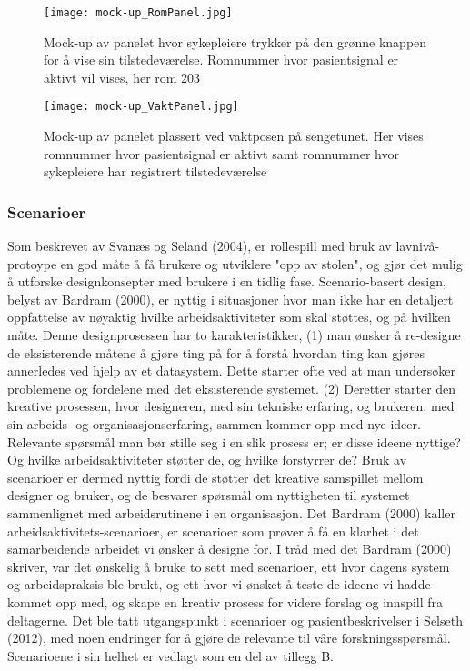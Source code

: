 \begin{figure}[H]
\centering
\texttt{[image: mock-up\_RomPanel.jpg]}
\caption{Mock-up av panelet hvor sykepleiere trykker på den grønne knappen for å vise sin tilstedeværelse. Romnummer hvor pasientsignal er aktivt vil vises, her rom 203}
\label{mock-up_RomPanel}
\end{figure}

\begin{figure}[H]
\centering
\texttt{[image: mock-up\_VaktPanel.jpg]}
\caption{Mock-up av panelet plassert ved vaktposen på sengetunet. Her vises romnummer hvor pasientsignal er aktivt samt romnummer hvor sykepleiere har registrert tilstedeværelse}
\label{mock-up_VaktPanel}
\end{figure}

\subsubsection{Scenarioer}
Som beskrevet av Svanæs og Seland (2004), er rollespill med bruk av lavnivå-protoype en god måte å få brukere og utviklere "opp av stolen", og gjør det mulig å utforske designkonsepter med brukere i en tidlig fase. Scenario-basert design, belyst av Bardram (2000), er nyttig i situasjoner hvor man ikke har en detaljert oppfattelse av nøyaktig hvilke arbeidsaktiviteter som skal støttes, og på hvilken måte. Denne designprosessen har to karakteristikker, (1) man ønsker å re-designe de eksisterende måtene å gjøre ting på for å forstå hvordan ting kan gjøres annerledes ved hjelp av et datasystem. Dette starter ofte ved at man undersøker problemene og fordelene med det eksisterende systemet. (2) Deretter starter den kreative prosessen, hvor designeren, med sin tekniske erfaring, og brukeren, med sin arbeids- og organisasjonserfaring, sammen kommer opp med nye ideer. Relevante spørsmål man bør stille seg i en slik prosess er; er disse ideene nyttige? Og hvilke arbeidsaktiviteter støtter de, og hvilke forstyrrer de? Bruk av scenarioer er dermed nyttig fordi de støtter det kreative samspillet mellom designer og bruker, og de besvarer spørsmål om nyttigheten til systemet sammenlignet med arbeidsrutinene i en organisasjon. Det Bardram (2000)\nocite{Bardram00} kaller arbeidsaktivitets-scenarioer, er scenarioer som prøver å få en klarhet i det samarbeidende arbeidet vi ønsker å designe for. 
I tråd med det Bardram (2000) skriver, var det ønskelig å bruke to sett med scenarioer, ett hvor dagens system og arbeidspraksis ble brukt, og ett hvor vi ønsket å teste de ideene vi hadde kommet opp med, og skape en kreativ prosess for videre forslag og innspill fra deltagerne. Det ble tatt utgangspunkt i scenarioer og pasientbeskrivelser i Selseth (2012)\nocite{Selseth12}, med noen endringer for å gjøre de relevante til våre forskningsspørsmål. Scenarioene i sin helhet er vedlagt som en del av tillegg B.

